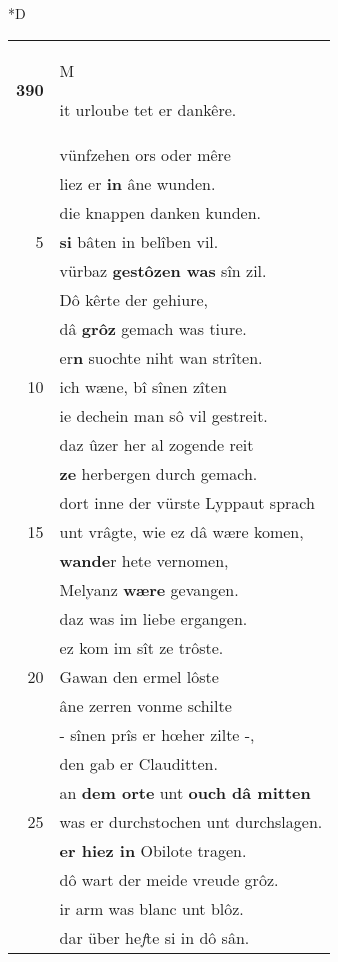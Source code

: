 \documentclass[8pt,a4paper,notitlepage]{article}
\begin{document}
\begin{table}[ht]
\begin{minipage}[t]{0.5\linewidth}
\small
\begin{center}*D
\end{center}
\begin{tabular}{rl}
\textbf{390} & \begin{large}M\end{large}it urloube tet er dankêre.\\ 
 & vünfzehen ors oder mêre\\ 
 & liez er \textbf{in} âne wunden.\\ 
 & die knappen danken kunden.\\ 
5 & \textbf{si} bâten in belîben vil.\\ 
 & vürbaz \textbf{gestôzen was} sîn zil.\\ 
 & Dô kêrte der gehiure,\\ 
 & dâ \textbf{grôz} gemach was tiure.\\ 
 & er\textbf{n} suochte niht wan strîten.\\ 
10 & ich wæne, bî sînen zîten\\ 
 & ie dechein man sô vil gestreit.\\ 
 & daz ûzer her al zogende reit\\ 
 & \textbf{ze} herbergen durch gemach.\\ 
 & dort inne der vürste Lyppaut sprach\\ 
15 & unt vrâgte, wie ez dâ wære komen,\\ 
 & \textbf{wande}r hete vernomen,\\ 
 & Melyanz \textbf{wære} gevangen.\\ 
 & daz was im liebe ergangen.\\ 
 & ez kom im sît ze trôste.\\ 
20 & Gawan den ermel lôste\\ 
 & âne zerren vonme schilte\\ 
 & - sînen prîs er hœher zilte -,\\ 
 & den gab er Clauditten.\\ 
 & an \textbf{dem orte} unt \textbf{ouch dâ mitten}\\ 
25 & was er durchstochen unt durchslagen.\\ 
 & \textbf{er hiez in} Obilote tragen.\\ 
 & dô wart der meide vreude grôz.\\ 
 & ir arm was blanc unt blôz.\\ 
 & dar über he\textit{f}te si in dô sân.\\ 

\end{tabular}
\end{minipage}
\end{table}
\end{document}
